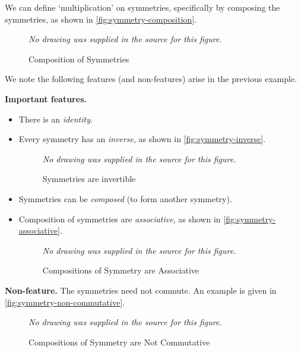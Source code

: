 \documentclass{article}
\theoremstyle{definition}
\theoremstyle{remark}
\begin{document}
We can define `multiplication' on symmetries, specifically by composing the symmetries, as shown in \autoref{fig:symmetry-composition}.

\begin{figure}[ht!]
    \centering
    \emph{No drawing was supplied in the source for this figure.}\par
\caption{Composition of Symmetries}
    \label{fig:symmetry-composition}
\end{figure}

We note the following features (and non-features) arise in the previous example. \bigbreak

\noindent
\textbf{Important features.}
\begin{itemize}
    \item There is an \emph{identity}.
    \item Every symmetry has an \emph{inverse}, as shown in \autoref{fig:symmetry-inverse}.

    \begin{figure}[ht!]
        \centering
        \emph{No drawing was supplied in the source for this figure.}\par
\caption{Symmetries are invertible}
        \label{fig:symmetry-inverse}
    \end{figure}

    \item Symmetries can be \emph{composed} (to form another symmetry).
    \item Composition of symmetries are \emph{associative}, as shown in \autoref{fig:symmetry-associative}.

    \begin{figure}[ht!]
        \centering
        \emph{No drawing was supplied in the source for this figure.}\par
\caption{Compositions of Symmetry are Associative}
        \label{fig:symmetry-associative}
    \end{figure}
\end{itemize}

\noindent
\textbf{Non-feature.} The symmetries need not commute. An example is given in \autoref{fig:symmetry-non-commutative}.

\begin{figure}[ht!]
    \centering
    \emph{No drawing was supplied in the source for this figure.}\par
\caption{Compositions of Symmetry are Not Commutative}
    \label{fig:symmetry-non-commutative}
\end{figure}
\end{document}
